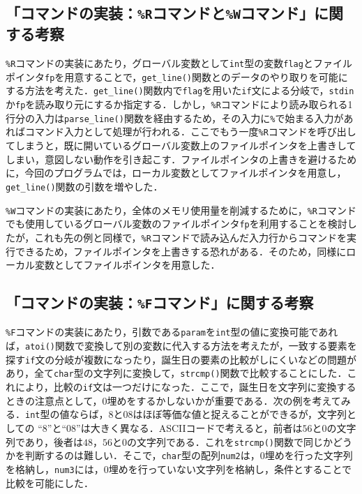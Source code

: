 \subsection{「コマンドの実装：\texttt{\%R}コマンドと\texttt{\%W}コマンド」に関する考察}

\verb|%R|コマンドの実装にあたり，グローバル変数として\verb|int|型の変数\verb|flag|とファイルポインタ\verb|fp|を用意することで，\verb|get_line()|関数とのデータのやり取りを可能にする方法を考えた．\verb|get_line()|関数内で\verb|flag|を用いた\verb|if|文による分岐で，\verb|stdin|か\verb|fp|を読み取り元にするか指定する．しかし，\verb|%R|コマンドにより読み取られる1行分の入力は\verb|parse_line()|関数を経由するため，その入力に\verb|%|で始まる入力があればコマンド入力として処理が行われる．ここでもう一度\verb|%R|コマンドを呼び出してしまうと，既に開いているグローバル変数上のファイルポインタを上書きしてしまい，意図しない動作を引き起こす．ファイルポインタの上書きを避けるために，今回のプログラムでは，ローカル変数としてファイルポインタを用意し，\verb|get_line()|関数の引数を増やした．

\verb|%W|コマンドの実装にあたり，全体のメモリ使用量を削減するために，\verb|%R|コマンドでも使用しているグローバル変数のファイルポインタ\verb|fp|を利用することを検討したが，これも先の例と同様で，\verb|%R|コマンドで読み込んだ入力行からコマンドを実行できるため，ファイルポインタを上書きする恐れがある．そのため，同様にローカル変数としてファイルポインタを用意した．

\subsection{「コマンドの実装：\texttt{\%F}コマンド」に関する考察}

\verb|%F|コマンドの実装にあたり，引数である\verb|param|を\verb|int|型の値に変換可能であれば，\verb|atoi()|関数で変換して別の変数に代入する方法を考えたが，一致する要素を探す\verb|if|文の分岐が複数になったり，誕生日の要素の比較がしにくいなどの問題があり，全て\verb|char|型の文字列に変換して，\verb|strcmp()|関数で比較することにした．これにより，比較の\verb|if|文は一つだけになった．ここで，誕生日を文字列に変換するときの注意点として，$0$埋めをするかしないかが重要である．次の例を考えてみる．\verb|int|型の値ならば，$8$と$08$はほぼ等価な値と捉えることができるが，文字列としての “$8$”と“$08$”は大きく異なる．ASCIIコードで考えると，前者は$56$と$0$の文字列であり，後者は$48$，$56$と$0$の文字列である．これを\verb|strcmp()|関数で同じかどうかを判断するのは難しい\cite{www:label11}．そこで，\verb|char|型の配列\verb|num2|は，$0$埋めを行った文字列を格納し，\verb|num3|には，$0$埋めを行っていない文字列を格納し，条件とすることで比較を可能にした．


